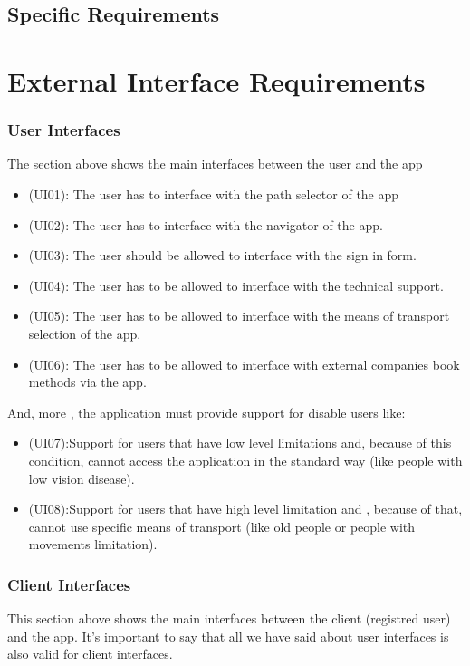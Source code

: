 \documentclass[a4paper]{book}
\begin{document}
\begin{itemize}
\end{itemize}

\chapter{Specific Requirements}

\part{External Interface Requirements}

\section{User Interfaces}
The section above shows the main interfaces between the user and the app 
\begin{itemize}
\item (UI01): The user has to interface with the path selector of the app
\item (UI02): The user has to interface with the navigator of the app.
\item (UI03): The user should be allowed to interface with the sign in form.
\item (UI04): The user has to be allowed to interface with the technical support.
\item (UI05): The user has to be allowed to interface with the means of transport selection of the app.
\item (UI06): The user has to be allowed to interface with external companies book methods via the app.
\end{itemize}

And, more , the application must provide support for disable users like:
\begin{itemize}

\item (UI07):Support for users that have low level limitations and, because of this condition, cannot access the application in the standard way (like people with low vision disease). 
\item (UI08):Support for users that have high level limitation and , because of that, cannot use specific means of transport (like old people or people with movements limitation).

\end{itemize}

\section{Client Interfaces}
This section above shows the main interfaces between the client (registred user) and the app.
It's important to say that all we have said about user interfaces is also valid for client interfaces.
\end{document}
